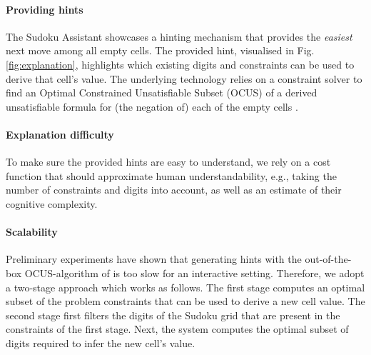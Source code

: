 \documentclass[letterpaper]{article} %
\begin{document}
\paragraph{Providing hints} %
The Sudoku Assistant showcases a hinting mechanism that provides the \emph{easiest} next move among all empty cells. 
The provided hint, visualised in Fig. \ref{fig:explanation}, highlights which existing digits and constraints can be used to derive that cell's value. 
The underlying technology relies on a constraint solver to find an Optimal Constrained Unsatisfiable Subset (OCUS) of a derived unsatisfiable formula for (the negation of) each of the empty cells \cite{stepwiseExplaining,OCUS}. 

\paragraph{Explanation difficulty}
To make sure the provided hints are easy to understand, we rely on a cost function that should approximate human understandability, e.g., taking the number of constraints and digits into account, as well as an estimate of their cognitive complexity.



\paragraph{Scalability} 
Preliminary experiments have shown that generating hints with the out-of-the-box OCUS-algorithm of \citet{OCUS} is too slow for an interactive setting. 
Therefore, we adopt a two-stage approach which works as follows. 
The first stage computes an optimal subset of the problem constraints that can be used to derive a new cell value. 
The second stage first filters the digits of the Sudoku grid that are present in the constraints of the first stage. Next, the system computes the optimal subset of digits required to infer the new cell's value.
\end{document}
